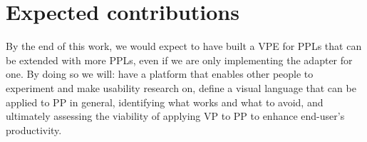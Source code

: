 \section{Expected contributions}

By the end of this work, we would expect to have built a VPE for PPLs that can
be extended with more PPLs, even if we are only implementing the adapter for one.
By doing so we will: have a platform that enables other people to experiment
and make usability research on, define a visual language that can be applied to PP in general,
identifying what works and what to avoid,
and ultimately assessing the viability of applying VP to PP to enhance end-user's
productivity.
